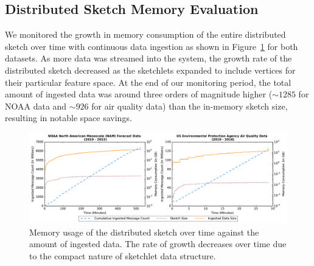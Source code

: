 \subsection{Distributed Sketch Memory Evaluation}
We monitored the growth in memory consumption of the entire distributed sketch over time with continuous data ingestion as shown in Figure~\ref{fig:dist-sketch-mem-usage} for both datasets. As more data was streamed into the system, the growth rate of the distributed sketch decreased as the sketchlets expanded to include vertices for their particular feature space.  At the end of our monitoring period, the total amount of ingested data was around three orders of magnitude higher ($\sim 1285$ for NOAA data and $\sim 926$ for air quality data) than the in-memory sketch size, resulting in notable space savings.
%
%
\begin{figure}[t!]
    \centerline{\includegraphics[width=\linewidth]{figures/ing-and-mem-usage-noaa-airquality.pdf}}
    \caption{Memory usage of the distributed sketch over time against the amount of ingested data. The rate of growth decreases over time due to the compact nature of sketchlet data structure.}
    \label{fig:dist-sketch-mem-usage}
\end{figure}
%
